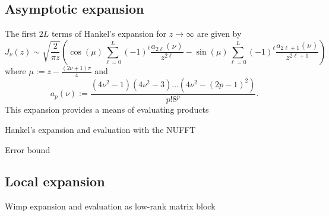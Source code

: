 
\subsection{Asymptotic expansion}

The first $2L$ terms of Hankel's expansion for $z \to \infty$ are given by
\begin{equation}
    J_\nu(z)
    \sim \sqrt{\frac{2}{\pi z}} \left( 
        \cos\left(\mu\right) \sum_{\ell=0}^L (-1)^\ell \frac{a_{2\ell}(\nu)}{z^{2\ell}}
        - \sin\left(\mu\right) \sum_{\ell=0}^L (-1)^\ell \frac{a_{2\ell+1}(\nu)}{z^{2\ell+1}}
        \right)
\end{equation}
where $\mu := z - \frac{(2\nu+1)\pi}{4}$ and 
\begin{equation}
    a_p(\nu) := \frac{(4\nu^2 - 1)(4\nu^2 - 3)\dots(4\nu^2 - (2p-1)^2)}{p! 8^p}.
\end{equation}
This expansion provides a means of evaluating products 

Hankel's expansion and evaluation with the NUFFT

Error bound

\subsection{Local expansion}

Wimp expansion and evaluation as low-rank matrix block

